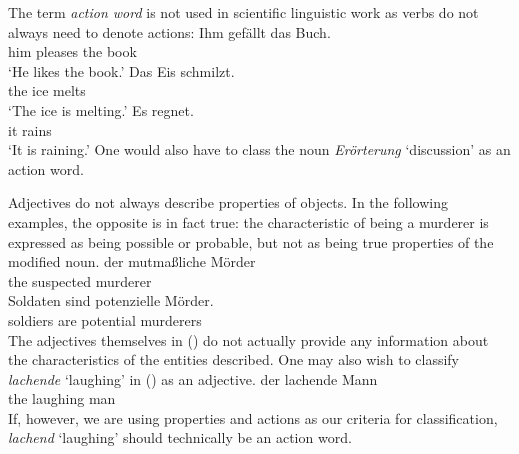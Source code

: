 The term \emph{action word} is not used in scientific linguistic work as verbs do not always need
to denote actions:
\eal
\ex
\gll Ihm gefällt das Buch.\\
	 him pleases the book\\
\glt `He likes the book.'
\ex 
\gll Das Eis schmilzt.\\
	 the ice melts\\
\glt `The ice is melting.'
\ex 
\gll Es regnet.\\
	 it rains\\
\glt `It is raining.'
\zl
One would also have to class the noun \emph{Erörterung} `discussion' as an action word.

Adjectives do not always describe properties of objects. In the following examples, the opposite is in fact true:
the characteristic of being a murderer is expressed as being possible or probable,  but not as being true properties of the modified noun.
\eal
\ex 
\gll der mutmaßliche Mörder\\
     the suspected murderer\\
\ex 
\gll Soldaten sind potenzielle Mörder.\\
     soldiers are potential murderers\\
\zl
The adjectives themselves in () do not actually provide any information about the characteristics of the entities described. One
may also wish to classify \emph{lachende} `laughing' in () as an adjective.
\ea
\gll der lachende Mann\\
	 the laughing man\\
\z
If, however, we are using properties and actions as our criteria for classification, \emph{lachend}
`laughing' should technically be an action word.

